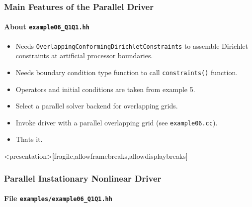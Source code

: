 \begin{frame}
\frametitle{Main Features of the Parallel Driver}
\framesubtitle{About \lstinline{example06_Q1Q1.hh}}
\begin{itemize}
\item Needs \lstinline{OverlappingConformingDirichletConstraints}
to assemble Dirichlet constraints at artificial processor boundaries.
\item Needs boundary condition type function to call \lstinline{constraints()} function.
\item Operators and initial conditions are taken from example 5.
\item Select a parallel solver backend for overlapping grids.
\item Invoke driver with a parallel overlapping grid (see \lstinline{example06.cc}).
\item Thats it.
\end{itemize}
\end{frame}

\begin{frame}<presentation>[fragile,allowframebreaks,allowdisplaybreaks]
\frametitle<presentation>{Parallel Instationary Nonlinear Driver}
\framesubtitle<presentation>{File \texttt{examples/example06\_Q1Q1.hh}}

\end{frame}
